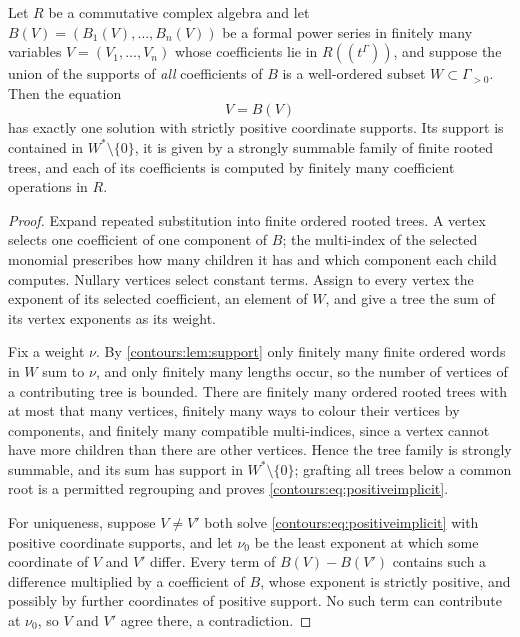 \documentclass[11pt,letterpaper]{article}
\theoremstyle{definition}
\theoremstyle{remark}
\numberwithin{equation}{section}
\begin{document}
\begin{lemma}
\label{contours:lem:positiveimplicit}
Let $R$ be a commutative complex algebra and let
$B(V)=(B_1(V),\ldots,B_n(V))$ be a formal power series in finitely many
variables $V=(V_1,\ldots,V_n)$ whose coefficients lie in $R((t^\Gamma))$, and
suppose the union of the supports of \emph{all} coefficients of $B$ is a
well-ordered subset $W\subset\Gamma_{>0}$. Then the equation
\begin{equation}\label{contours:eq:positiveimplicit}
  V=B(V)
\end{equation}
has exactly one solution with strictly positive coordinate supports. Its support
is contained in $W^*\setminus\{0\}$, it is given by a strongly summable family of
finite rooted trees, and each of its coefficients is computed by finitely many
coefficient operations in $R$.
\end{lemma}
\begin{proof}
Expand repeated substitution into finite ordered rooted trees. A vertex selects
one coefficient of one component of $B$; the multi-index of the selected monomial
prescribes how many children it has and which component each child computes.
Nullary vertices select constant terms. Assign to every vertex the exponent of
its selected coefficient, an element of $W$, and give a tree the sum of its
vertex exponents as its weight.

Fix a weight $\nu$. By \cref{contours:lem:support} only finitely many finite
ordered words in $W$ sum to $\nu$, and only finitely many lengths occur, so the
number of vertices of a contributing tree is bounded. There are finitely many
ordered rooted trees with at most that many vertices, finitely many ways to
colour their vertices by components, and finitely many compatible multi-indices,
since a vertex cannot have more children than there are other vertices. Hence the
tree family is strongly summable, and its sum has support in
$W^*\setminus\{0\}$; grafting all trees below a common root is a permitted
regrouping and proves \eqref{contours:eq:positiveimplicit}.

For uniqueness, suppose $V\ne V'$ both solve \eqref{contours:eq:positiveimplicit}
with positive coordinate supports, and let $\nu_0$ be the least exponent at which
some coordinate of $V$ and $V'$ differ. Every term of $B(V)-B(V')$ contains such a
difference multiplied by a coefficient of $B$, whose exponent is strictly
positive, and possibly by further coordinates of positive support. No such term
can contribute at $\nu_0$, so $V$ and $V'$ agree there, a contradiction.
\end{proof}
\end{document}
